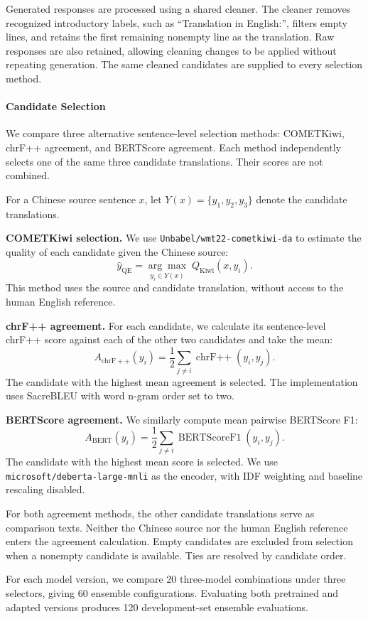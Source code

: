 \documentclass[11pt]{article}
\begin{document}
Generated responses are processed using a shared cleaner. The cleaner removes recognized introductory labels, such as “Translation in English:”, filters empty lines, and retains the first remaining nonempty line as the translation. Raw responses are also retained, allowing cleaning changes to be applied without repeating generation. The same cleaned candidates are supplied to every selection method.

\paragraph{Candidate Selection}
We compare three alternative sentence-level selection methods:
COMETKiwi, chrF++ agreement, and BERTScore agreement.
Each method independently selects one of the same three
candidate translations. Their scores are not combined.

For a Chinese source sentence $x$, let
$Y(x)=\{y_1,y_2,y_3\}$ denote the candidate translations.

\textbf{COMETKiwi selection.}
We use \texttt{Unbabel/wmt22-cometkiwi-da} to estimate the quality of each candidate given the Chinese source:
\[
\hat{y}_{\mathrm{QE}}
=
\underset{y_i\in Y(x)}{\arg\max}\;
Q_{\mathrm{Kiwi}}(x,y_i).
\]
This method uses the source and candidate translation, without access to the human English reference.

\textbf{chrF++ agreement.}
For each candidate, we calculate its sentence-level chrF++ score against each of the other two candidates and take the mean:
\[
A_{\mathrm{chrF++}}(y_i)
=
\frac{1}{2}\sum_{j\ne i}
\operatorname{chrF++}(y_i,y_j).
\]
The candidate with the highest mean agreement is selected. The implementation uses SacreBLEU with word n-gram order set to two.

\textbf{BERTScore agreement.}
We similarly compute mean pairwise BERTScore F1:
\[
A_{\mathrm{BERT}}(y_i)
=
\frac{1}{2}\sum_{j\ne i}
\operatorname{BERTScoreF1}(y_i,y_j).
\]
The candidate with the highest mean score is selected. We use \texttt{microsoft/deberta-large-mnli} as the encoder, with IDF weighting and baseline rescaling disabled.

For both agreement methods, the other candidate translations serve as comparison texts. Neither the Chinese source nor the human English reference enters the agreement calculation. Empty candidates are excluded from selection when a nonempty candidate is available. Ties are resolved by candidate order.

For each model version, we compare 20 three-model combinations under three selectors, giving 60 ensemble configurations. Evaluating both pretrained and adapted versions produces 120 development-set ensemble evaluations.
\end{document}
